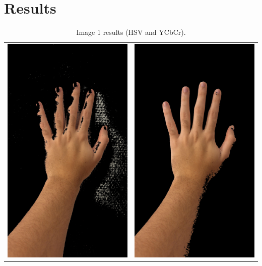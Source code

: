 \documentclass[journal]{IEEEtran}
\begin{document}
\section{Results}

\begin{table}[!htbp]
\centering
\begin{tabular}{cc}
    \includegraphics[width=0.3\linewidth]{images/results/hand1_skin_hsv.jpg} & \includegraphics[width=0.3\linewidth]{images/results/hand1_skin_ycc.jpg} \\
\end{tabular}
\caption{Image 1 results (HSV and YCbCr).}
\label{tab:imagens}
\end{table}
\end{document}
